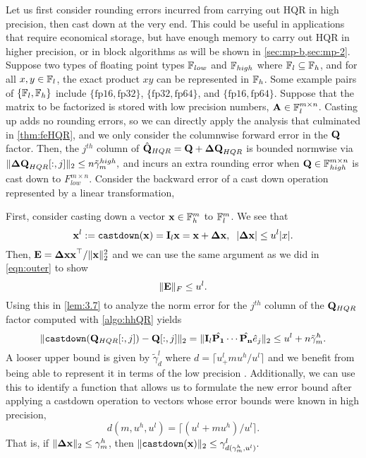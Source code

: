 Let us first consider rounding errors incurred from carrying out HQR in high precision, then cast down at the very end.
This could be useful in applications that require economical storage, but have enough memory to carry out HQR in higher precision, or in block algorithms as will be shown in \cref{sec:mp-b,sec:mp-2}.
Suppose two types of floating point types $\mathbb{F}_{low}$ and $\mathbb{F}_{high}$ where $\mathbb{F}_{l}\subseteq \mathbb{F}_{h}$, and for all $x,y\in\mathbb{F}_{l}$, the exact product $xy$ can be represented in $\mathbb{F}_{h}$.
Some example pairs of $\{\mathbb{F}_{l}, \mathbb{F}_{h}\}$ include $\{\text{fp16}, \text{fp32}\}$, $\{\text{fp32}, \text{fp64}\}$, and $\{\text{fp16}, \text{fp64}\}$.
Suppose that the matrix to be factorized is stored with low precision numbers, $\mathbf{A}\in\mathbb{F}_{l}^{m\times n}$.
Casting up adds no rounding errors, so we can directly apply the analysis that culminated in \cref{thm:feHQR}, and we only consider the columnwise forward error in the $\mathbf{Q}$ factor.
Then, the $j^{th}$ column of $\hat{\mathbf{Q}}_{HQR} = \mathbf{Q} + \mathbf{\Delta Q}_{HQR}$ is bounded normwise via $\|\mathbf{\Delta Q}_{HQR}[:,j]\|_2 \leq n\tilde{\gamma}_{m}^{high},$ and incurs an extra rounding error when $\mathbf{Q}\in\mathbb{F}_{high}^{m\times n}$ is cast down to $F_{low}^{m\times n}$.
Consider the backward error of a cast down operation represented by a linear transformation, 

First, consider casting down a vector $\mathbf{x}\in\mathbb{F}_h^m$ to $\mathbb{F}_l^m$.
We see that
\begin{equation}
	\mathbf{x}^l := \text{\tt castdown}(\mathbf{x}) = \mathbf{I}_{l}\mathbf{x} = \mathbf{x}+\mathbf{\Delta x},\;\; |\mathbf{\Delta x}| \leq u^l |x|. 
\end{equation}
Then, $\mathbf{E} = \mathbf{\Delta x x}^{\top}/\|\mathbf{x}\|_2^2$ and we can use the same argument as we did in \cref{eqn:outer} to show 
\begin{equation}
	\|\bb{E}\|_F\leq u^l. \label{eqn:castdown}
\end{equation}
Using this in \cref{lem:3.7} to analyze the norm error for the $j^{th}$ column of the $\mathbf{Q}_{HQR}$ factor computed with \cref{algo:hhQR} yields
\begin{equation}
	\|\text{\tt castdown}(\mathbf{Q}_{HQR}[:,j]) - \mathbf{Q}[:,j]\|_2 = \|\mathbf{I}_l\hat{\mathbf{P_1}}\cdots\hat{\mathbf{P_n}}\hat{e}_j\|_2 \leq u^l+n\tilde{\gamma}_m^h.
\end{equation}
A looser upper bound is given by $\tilde{\gamma}_d^l$ where $d = \lceil u^l_+mu^h/u^l\rceil$ and we benefit from being able to represent it in terms of the low precision . 
Additionally, we can use this to identify a function that allows us to formulate the new error bound after applying a castdown operation to vectors whose error bounds were known in high precision,
\begin{equation}
	d(m,u^h, u^l) = \lceil (u^l+mu^h)/u^l\rceil.
\end{equation} 
That is, if $\|\mathbf{\Delta x}\|_2 \leq \gamma_m^h$, then $\|\text{\tt castdown}(\mathbf{x})\|_2 \leq \gamma_{d(\gamma_m^h, u^l)}^l.$

